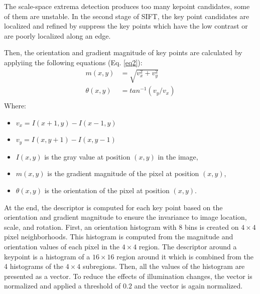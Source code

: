 \documentclass{gretsi}
\begin{document}
The scale-space extrema detection produces too many kepoint candidates, some of them are unstable. In the second stage of SIFT, the key point candidates are localized and refined by suppress the key points which have the low contrast or are poorly localized along an edge. 

Then, the orientation and gradient magnitude of key points are calculated by applyiing the following equations (Eq. \ref{eq2}):
\begin{equation}
\label{eq2}
\begin{split}
	m(x,y) &= \sqrt{v_x^2 + v_y^2} \\
	\theta(x,y)& = tan^{-1}(v_y/v_x) \\
\end{split}
\end{equation}
Where:
\begin{itemize}
	\item $v_x = I(x+1,y) - I(x-1,y)$
	\item $v_y = I(x,y+1) - I(x,y-1)$
	\item $I(x,y)$ is the gray value at position $(x,y)$ in the image,
	\item $m(x,y)$ is the gradient magnitude of the pixel at position $(x,y)$,
	\item $\theta(x,y)$ is the orientation of the pixel at position $(x,y)$.
\end{itemize} 
At the end, the descriptor is computed for each key point based on the orientation and gradient magnitude to ensure the invariance to image location, scale, and rotation. First, an orientation histogram with 8 bins is created on $4 \times 4$ pixel neighborhoods. This histogram is computed from the magnitude and orientation values of each pixel in the $4 \times 4$ region. The descriptor around a keypoint is a histogram of a $16 \times 16$ region around it which is combined from the 4 histograms of the $4 \times 4$ subregions. Then, all the values of the histogram are presented as a vector. To reduce the effects of illumination changes, the vector is normalized and applied a threshold of $0.2$ and the vector is again normalized.

\end{document}
